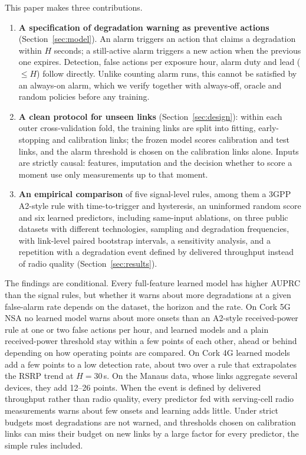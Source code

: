 \documentclass[preprint,review,12pt]{elsarticle}
\begin{document}
This paper makes three contributions.
\begin{enumerate}
\item \textbf{A specification of degradation warning as preventive actions}
(Section~\ref{sec:model}). An alarm triggers an action that claims a degradation
within $H$ seconds; a still-active alarm triggers a new action when the previous
one expires. Detection, false actions per exposure hour, alarm duty and lead
($\le H$) follow directly. Unlike counting alarm runs, this cannot be satisfied by
an always-on alarm, which we verify together with always-off, oracle and random
policies before any training.
\item \textbf{A clean protocol for unseen links} (Section~\ref{sec:design}): within
each outer cross-validation fold, the training links are split into fitting,
early-stopping and calibration links; the frozen model scores calibration and test
links, and the alarm threshold is chosen on the calibration links alone. Inputs are
strictly causal: features, imputation and the decision whether to score a moment
use only measurements up to that moment.
\item \textbf{An empirical comparison} of five signal-level rules, among them a
3GPP A2-style rule with time-to-trigger and hysteresis, an uninformed random score and
six learned predictors, including same-input ablations, on three public datasets with
different technologies, sampling and degradation frequencies, with link-level paired
bootstrap intervals, a sensitivity analysis, and a repetition with a degradation event
defined by delivered throughput instead of radio quality (Section~\ref{sec:results}).
\end{enumerate}

The findings are conditional. Every full-feature learned model has higher AUPRC than
the signal rules, but whether it warns about more degradations at a given false-alarm
rate depends on the dataset, the horizon and the rate. On Cork 5G NSA no learned model
warns about more onsets than an A2-style received-power rule at one or two false
actions per hour, and learned models and a plain received-power threshold stay within a
few points of each other, ahead or behind depending on how operating points are
compared. On Cork 4G learned models add a few points to a low detection rate, about two
over a rule that extrapolates the RSRP trend at $H=30$\,s. On the Manaus data, whose
links aggregate several devices, they add 12--26 points. When the event is defined by
delivered throughput rather than radio quality, every predictor fed with serving-cell
radio measurements warns about few onsets and learning adds little. Under
strict budgets most degradations are not warned, and thresholds chosen on
calibration links can miss their budget on new links by a large factor for every
predictor, the simple rules included.
\end{document}
